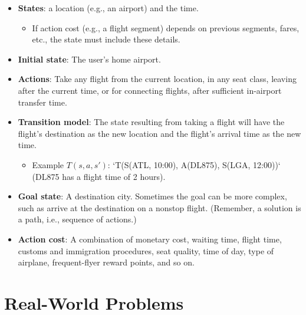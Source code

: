 \documentclass[11pt]{article}
\begin{document}
\begin{itemize}
\item \textbf{States}: a location (e.g., an airport) and the time.

\begin{itemize}
\item If action cost (e.g., a flight segment) depends on previous segments, fares, etc., the state must include these details.
\end{itemize}

\item \textbf{Initial state}: The user’s home airport.
\item \textbf{Actions}: Take any flight from the current location, in any seat class, leaving after the current time, or for connecting flights, after sufficient in-airport transfer time.
\item \textbf{Transition model}: The state resulting from taking a flight will have the flight’s destination as the new location and the flight’s arrival time as the new time.

\begin{itemize}
\item Example \(T(s, a, s')\): `T(S(ATL, 10:00), A(DL875), S(LGA, 12:00))` (DL875 has a flight time of 2 hours).
\end{itemize}

\item \textbf{Goal state}: A destination city. Sometimes the goal can be more complex, such as arrive at the destination on a nonstop flight.  (Remember, a solution is a path, i.e., sequence of actions.)
\item \textbf{Action cost}: A combination of monetary cost, waiting time, flight time, customs and immigration procedures, seat quality, time of day, type of airplane, frequent-flyer reward points, and so on.
\end{itemize}
\section{Real-World Problems}
\label{sec:org8de28ca}
\end{document}

